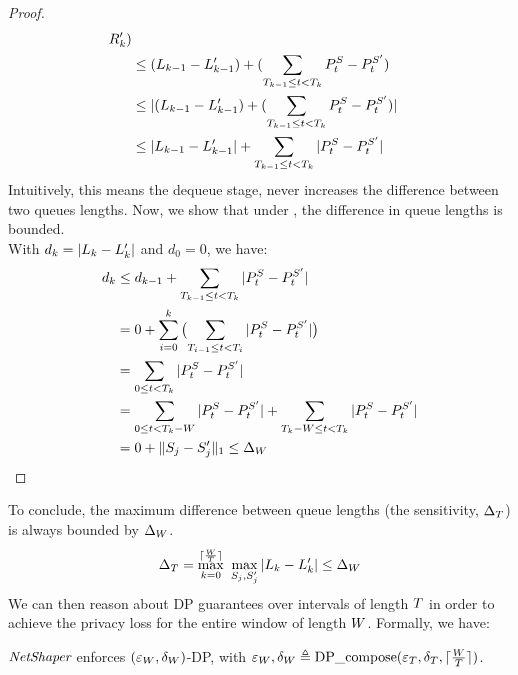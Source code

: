 \begin{proof}
\begin{align*}
    {R}_{k}')
    \\
    & \leq
    (L_{k-1} - L_{k-1}')
    +
    (\sum_{T_{k-1} \leq t < T_{k}}P^S_t - P^{S'}_t)
    \\
    & \leq
    |
    (L_{k-1} - L_{k-1}')
    +
    (\sum_{T_{k-1} \leq t < T_{k}}P^S_t - P^{S'}_t)
    |
    \\
    & \leq
    |L_{k-1} - L_{k-1}'|
    +
    \sum_{T_{k-1} \leq t < T_{k}}|P^S_t - P^{S'}_t|
    \end{align*}
    Intuitively, this means the dequeue stage, never increases the difference
    between two queues lengths.
    Now, we show that under , the difference in queue lengths is bounded.
    \\
    With $d_k = |L_{k}-L_{k}'|$ and $d_0 = 0$, we have:
    \begin{align}
    \nonumber
    & d_k \leq d_{k-1} + \sum_{T_{k-1} \leq t < T_{k}}|P^S_t - P^{S'}_t|\\
    &~~~=
    \nonumber
    0 + \sum_{i=0}^{k}\big({\sum_{T_{i-1} \leq t < T_{i}}|P^S_t - P^{S'}_t|}\big)\\
    &~~~=
    \nonumber
    \sum_{0 \leq t < T_{k}} |P^S_t - P^{S'}_t|\\
    \nonumber
    &~~~= \sum_{0 \leq t < T_k - W} |P^S_t - P^{S'}_t| +
    \sum_{T_{k} - W \leq t < T_{k}} |P^S_t - P^{S'}_t|\\
    \nonumber
    &~~~=
    0 + \|S_{j} - S_{j}'\|_1
    \leq
    \Delta_{W}
    \end{align}
\end{proof}
\noindent To conclude, the maximum difference between queue lengths (\ie the sensitivity,
$\Delta_T$) is always bounded by $\Delta_{W}$.
\begin{align}
        \Delta_T = \max_{k = 0}^{\lceil \frac{W}{T} \rceil}~\max_{S_{j},
        S_{j}'} | L_{k} - L_{k}' | \leq \Delta_{W}
\end{align}
We can then reason about DP guarantees over intervals of length $T$ in
order to achieve the privacy loss for the entire window of length $W$.
%
Formally, we have:
\begin{proposition}\label{prop:dp}
    {$\textit{NetShaper}$} enforces $(\varepsilon_{W}, \delta_{W})$-DP, 
    with $\varepsilon_{W}, \delta_{W} \triangleq
    \textrm{DP\_compose}(\varepsilon_T, \delta_T, \lceil \frac{W}{T} \rceil)$.
\end{proposition}
